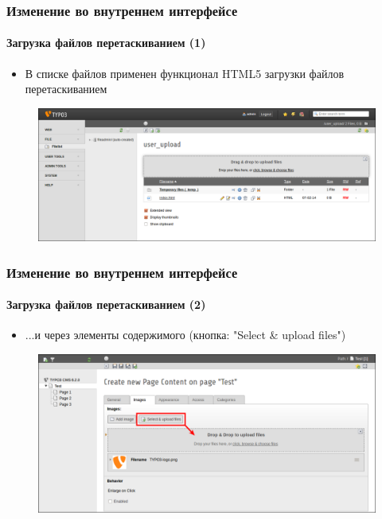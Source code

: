 
\begin{frame}[fragile]
	\frametitle{Изменение во внутреннем интерфейсе}
	\framesubtitle{Загрузка файлов перетаскиванием (1)}

	\begin{itemize}
		\item В списке файлов применен функционал HTML5 загрузки файлов перетаскиванием

	\end{itemize}

	\begin{figure}
		\includegraphics[width=0.95\linewidth]{Images/BackendChanges/DragDropFileUpload.png}
	\end{figure}

\end{frame}


\begin{frame}[fragile]
	\frametitle{Изменение во внутреннем интерфейсе}
	\framesubtitle{Загрузка файлов перетаскиванием (2)}

	\begin{itemize}
		\item ...и через элементы содержимого (кнопка: "Select \& upload files")

	\end{itemize}

	\begin{figure}
		\includegraphics[width=0.95\linewidth]{Images/BackendChanges/SelectAndUploadFiles.png}
	\end{figure}

\end{frame}

